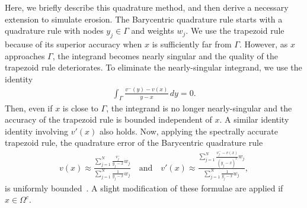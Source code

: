 \documentclass[preprint, 10pt]{elsarticle}
\begin{document}
Here, we briefly describe this quadrature method, and then derive a
necessary extension to simulate erosion.  The Barycentric quadrature
rule starts with a quadrature rule with nodes $y_j \in \Gamma$ and
weights $w_j$. We use the trapezoid rule because of its superior
accuracy when $x$ is sufficiently far from $\Gamma$.  However, as $x$
approaches $\Gamma$, the integrand becomes nearly singular and the
quality of the trapezoid rule deteriorates. To eliminate the
nearly-singular integrand, we use the identity
\begin{align}
  \int_{\Gamma} \frac{v^{-}(y) - v(x)}{y - x} \,dy = 0.
\end{align}
Then, even if $x$ is close to $\Gamma$, the integrand is no longer
nearly-singular and the accuracy of the trapezoid rule is bounded
independent of $x$.  A similar identity identity involving $v'(x)$ also
holds.   Now, applying the spectrally accurate trapezoid rule, the
quadrature error of the Barycentric quadrature rule
\begin{align}
  v(x) \approx \frac{\sum\limits_{j=1}^N \frac{v_j^-}{y_j-x}w_j}
    {\sum\limits_{j=1}^N \frac{1}{y_j-x}w_j}
  \quad \text{and} \quad
  v'(x) \approx \frac{\sum\limits_{j=1}^N 
    \frac{v_j^- - v(x)}{(y_j - x)^2}w_j}
    {\sum\limits_{j=1}^N \frac{1}{y_j-x}w_j}, 
  \label{eqn:vvpQuadrature}
\end{align}
is uniformly bounded~\cite{bar-wu-vee2015}.  A slight modification of
these formulae are applied if $x \in \Omega^{c}$.

\end{document}

